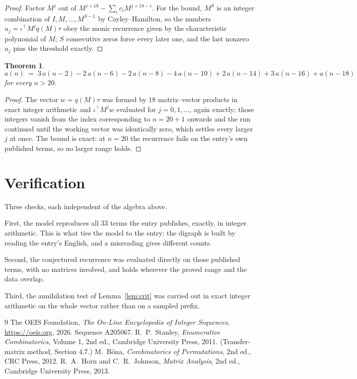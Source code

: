 \documentclass[11pt,a4paper]{article}
\theoremstyle{plain}
\newtheorem{theorem}{Theorem}
\theoremstyle{definition}
\begin{document}
\begin{proof}
Factor $M^{j}$ out of $M^{j+18}-\sum_ic_iM^{j+18-i}$. For the bound, $M^{S}$
is an integer combination of $I,M,\dots,M^{S-1}$ by Cayley--Hamilton, so the numbers
$u_j=\iota^{\!\top}M^{j}q(M)\tau$ obey the monic recurrence given by the characteristic
polynomial of $M$; $S$ consecutive zeros force every later one, and the last nonzero $u_j$
pins the threshold exactly.
\end{proof}

\begin{theorem}
\[
a(n)\;=\;3\,a(n-2) - 2\,a(n-6) - 2\,a(n-8) - 4\,a(n-10) + 2\,a(n-14) + 3\,a(n-16) + a(n-18)
\]
for every $n>20$.
\end{theorem}

\begin{proof}
The vector $w=q(M)\tau$ was formed by $18$ matrix--vector products in exact integer
arithmetic and $\iota^{\!\top}M^{j}w$ evaluated for $j=0,1,\dots$, again exactly; those
integers vanish from the index corresponding to $n=20+1$ onwards and the run continued
until the working vector was identically zero, which settles every larger $j$ at once. The bound is exact: at $n=20$ the recurrence fails on the entry's own published terms, so no larger range holds.
\end{proof}

\section{Verification}

Three checks, each independent of the algebra above.

First, the model reproduces all $33$ terms the entry publishes, exactly, in integer
arithmetic. This is what ties the model to the entry: the digraph is built by reading the
entry's English, and a misreading gives different counts.

Second, the conjectured recurrence was evaluated directly on those published terms, with no
matrices involved, and holds wherever the proved range and the data overlap.

Third, the annihilation test of Lemma~\ref{lem:crit} was carried out in exact integer
arithmetic on the whole vector rather than on a sampled prefix.

\begin{thebibliography}{9}
 The OEIS Foundation, \emph{The On-Line Encyclopedia of Integer
Sequences}, \url{https://oeis.org}, 2026. Sequence A205067.
 R.~P.~Stanley, \emph{Enumerative Combinatorics}, Volume 1, 2nd ed.,
Cambridge University Press, 2011. (Transfer-matrix method, Section 4.7.)
 M.~B\'ona, \emph{Combinatorics of Permutations}, 2nd ed., CRC
Press, 2012.
 R.~A.~Horn and C.~R.~Johnson, \emph{Matrix Analysis}, 2nd ed., Cambridge
University Press, 2013.
\end{thebibliography}
\end{document}
